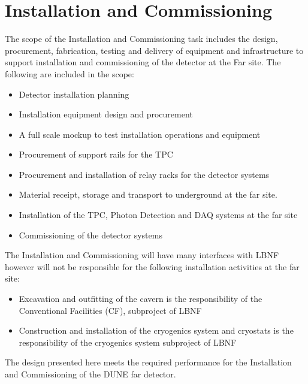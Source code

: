 \section{Installation and Commissioning}
\label{sec:detectors-fd-ref-install}

The scope of the Installation and Commissioning task includes the design, procurement, fabrication, testing and delivery of equipment and infrastructure to support installation and commissioning of the detector at the Far site. The following are included in the scope:
\begin{itemize}
\item Detector installation planning
\item Installation equipment design and procurement
\item A full scale mockup to test installation operations and equipment
\item Procurement of support rails for the TPC
\item Procurement and installation of relay racks for the detector systems
\item Material receipt, storage and transport to underground at the far site.
\item Installation of the TPC, Photon Detection and DAQ systems at the far site
\item Commissioning of the detector systems
\end{itemize}

The Installation and Commissioning will have many interfaces with LBNF however will not be responsible for the following installation activities at the far site:
\begin{itemize}
\item Excavation and outfitting of the cavern is the responsibility of the Conventional Facilities (CF), subproject of LBNF
\item Construction and installation of the cryogenics system and cryostats is the responsibility of the cryogenics system subproject of LBNF
\end{itemize}

The design presented here meets the required performance for the Installation and Commissioning of the DUNE far detector. 

